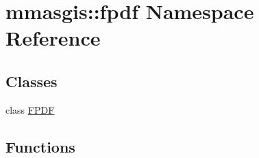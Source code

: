 \hypertarget{namespacemmasgis_1_1fpdf}{
\section{mmasgis::fpdf Namespace Reference}
\label{namespacemmasgis_1_1fpdf}
}
\subsection*{Classes}
\begin{DoxyCompactItemize}
\item 
class \hyperlink{classmmasgis_1_1fpdf_1_1FPDF}{FPDF}
\end{DoxyCompactItemize}
\subsection*{Functions}

